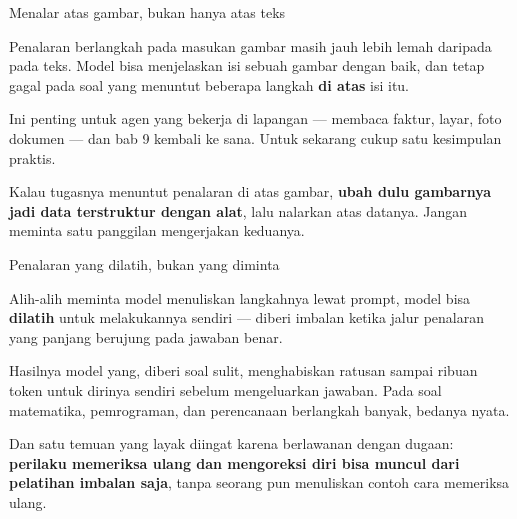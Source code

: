 \documentclass[aspectratio=169,11pt,t]{beamer}
\begin{document}
\begin{frame}[shrink=25]{Menalar atas gambar, bukan hanya atas teks}
{\fontsize{9.4}{12.6}\selectfont\color{fg2}Penalaran berlangkah pada masukan gambar masih jauh lebih lemah daripada pada teks. Model bisa menjelaskan isi sebuah gambar dengan baik, dan tetap gagal pada soal yang menuntut beberapa langkah \textbf{di atas} isi itu.\par}\vskip 4pt
{\fontsize{9.4}{12.6}\selectfont\color{fg2}Ini penting untuk agen yang bekerja di lapangan --- membaca faktur, layar, foto dokumen --- dan bab 9 kembali ke sana. Untuk sekarang cukup satu kesimpulan praktis.\par}\vskip 4pt
\begin{iband}[signal]
Kalau tugasnya menuntut penalaran di atas gambar, \textbf{ubah dulu gambarnya jadi data terstruktur dengan alat}, lalu nalarkan atas datanya. Jangan meminta satu panggilan mengerjakan keduanya.
\end{iband}
\end{frame}


\begin{frame}[shrink=25]{Penalaran yang dilatih, bukan yang diminta}
{\fontsize{9.4}{12.6}\selectfont\color{fg2}Alih-alih meminta model menuliskan langkahnya lewat prompt, model bisa \textbf{dilatih} untuk melakukannya sendiri --- diberi imbalan ketika jalur penalaran yang panjang berujung pada jawaban benar.\par}\vskip 4pt
{\fontsize{9.4}{12.6}\selectfont\color{fg2}Hasilnya model yang, diberi soal sulit, menghabiskan ratusan sampai ribuan token untuk dirinya sendiri sebelum mengeluarkan jawaban. Pada soal matematika, pemrograman, dan perencanaan berlangkah banyak, bedanya nyata.\par}\vskip 4pt
\begin{iband}[signal]
Dan satu temuan yang layak diingat karena berlawanan dengan dugaan: \textbf{perilaku memeriksa ulang dan mengoreksi diri bisa muncul dari pelatihan imbalan saja}, tanpa seorang pun menuliskan contoh cara memeriksa ulang.
\end{iband}
\end{frame}
\end{document}
